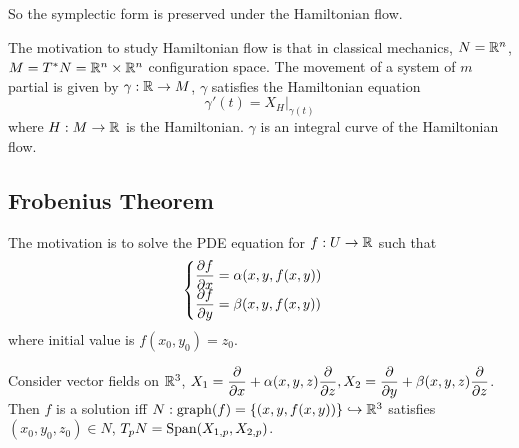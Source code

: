 So the symplectic form is preserved under the Hamiltonian flow.

The motivation to study Hamiltonian flow is that in classical mechanics,  $ N=\mathbb R^n $,  $ M=T^*N=\mathbb R^n\times \mathbb R^n $ configuration space. The movement of a system of  $ m  $ partial is given by  $ \gamma:\mathbb R\rightarrow M $,  $ \gamma  $ satisfies the Hamiltonian equation 
\[\gamma'(t)=X_H|_{\gamma(t)}\] 
where  $ H:M\rightarrow \mathbb R $ is the Hamiltonian. \ie  $ \gamma  $ is an integral curve of the Hamiltonian flow.  

\subsection{Frobenius Theorem}
The motivation is to solve the PDE equation for  $ f:U\rightarrow \mathbb R $ such that
\begin{equation}
    \begin{cases}
        \displaystyle\frac{\partial f}{\partial x}=\alpha(x,y,f(x,y))\\
        \displaystyle\frac{\partial f}{\partial y}=\beta(x,y,f(x,y))\\
    \end{cases}
\end{equation}
where initial value is  $ f(x_0,y_0)=z_0 $.

Consider vector fields on  $ \mathbb R^3 $,  $ X_1=\displaystyle\frac{\partial }{\partial x}+\alpha(x,y,z)\frac{\partial }{\partial z} ,X_2=\displaystyle\frac{\partial  }{\partial y}+\beta(x,y,z)\frac{\partial  }{\partial z}$. Then  $ f  $ is a solution iff  $ N:\mathrm{graph}(f)=\{(x,y,f(x,y))\}\hookrightarrow\mathbb R^3 $ satisfies  $ (x_0,y_0,z_0)\in N $,  $ T_pN=\mathrm{Span}(X_{1,p},X_{2,p}) $.


